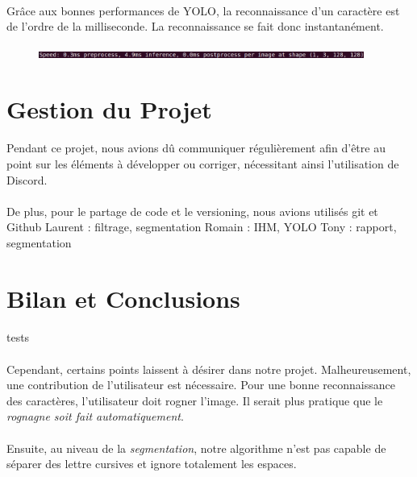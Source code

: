 \documentclass[a4paper]{article}
\begin{document}
			\paragraph{} Grâce aux bonnes performances de YOLO, la reconnaissance d'un caractère est de l'ordre de la milliseconde. La reconnaissance se fait donc instantanément.

			\begin{figure}[h]
				\centering
				\includegraphics[width=0.95\textwidth]{speedYOLO.png}
				\caption{}
				\label{fig:speedYOLO}
			\end{figure}

	\section{Gestion du Projet}
		\paragraph{} Pendant ce projet, nous avions dû communiquer régulièrement afin d'être au point sur les éléments à développer ou corriger, nécessitant ainsi l'utilisation de Discord.
		\paragraph{} De plus, pour le partage de code et le versioning, nous avions utilisés git et Github
		Laurent : filtrage, segmentation
		Romain : IHM, YOLO
		Tony : rapport, segmentation 
	\section*{Bilan et Conclusions}%
		\paragraph{}
			tests
		\paragraph{}
			Cependant, certains points laissent à désirer dans notre projet. Malheureusement, une contribution de l'utilisateur est nécessaire. Pour une bonne reconnaissance des caractères, l'utilisateur doit rogner l'image. Il serait plus pratique que le \emph{rognagne soit fait automatiquement}. 
		\paragraph{}
			Ensuite, au niveau de la \emph{segmentation}, notre algorithme n'est pas capable de séparer des lettre cursives et ignore totalement les espaces.
\end{document}
